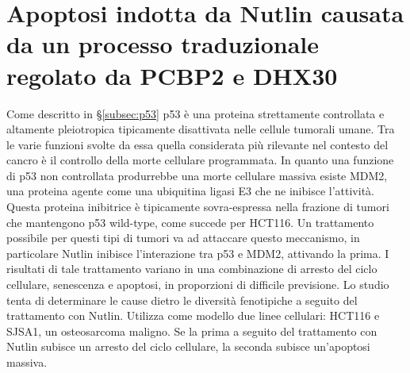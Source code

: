 \section{Apoptosi indotta da Nutlin causata da un processo traduzionale regolato da PCBP2 e DHX30}
Come descritto in \S\ref{subsec:p53} p53 \`e una proteina strettamente controllata e altamente pleiotropica tipicamente disattivata nelle cellule tumorali umane.
Tra le varie funzioni svolte da essa quella considerata pi\`u rilevante nel contesto del cancro \`e il controllo della morte cellulare programmata.
In quanto una funzione di p53 non controllata produrrebbe una morte cellulare massiva esiste MDM2, una proteina agente come una ubiquitina ligasi E3 che ne inibisce l'attivit\`a.
Questa proteina inibitrice \`e tipicamente sovra-espressa nella frazione di tumori che mantengono p53 wild-type, come succede per HCT116.
Un trattamento possibile per questi tipi di tumori va ad attaccare questo meccanismo, in particolare Nutlin inibisce l'interazione tra p53 e MDM2, attivando la prima.
I risultati di tale trattamento variano in una combinazione di arresto del ciclo cellulare, senescenza e apoptosi, in proporzioni di difficile previsione.
Lo studio \cite{nutlin} tenta di determinare le cause dietro le diversit\`a fenotipiche a seguito del trattamento con Nutlin.
Utilizza come modello due linee cellulari: HCT116 e SJSA1, un osteosarcoma maligno.
Se la prima a seguito del trattamento con Nutlin subisce un arresto del ciclo cellulare, la seconda subisce un'apoptosi massiva.

